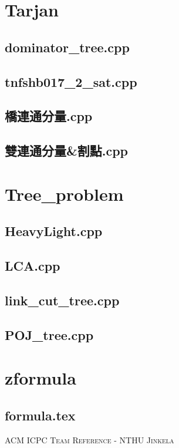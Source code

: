 \documentclass[a4paper,10pt,oneside]{article}
\newcommand{\includecpp}[2]{
  \subsection{#1}
    
}
\newcommand{\includetex}[2]{
  \subsection{#1}
    
}
\begin{document}
\begin{landscape}
\begin{multicols}{4}
\section{Tarjan}
  \includecpp{dominator\_tree.cpp}{./Tarjan/dominator_tree.cpp}
  \includecpp{tnfshb017\_2\_sat.cpp}{./Tarjan/tnfshb017_2_sat.cpp}
  \includecpp{橋連通分量.cpp}{./Tarjan/橋連通分量.cpp}
  \includecpp{雙連通分量\&割點.cpp}{./Tarjan/雙連通分量&割點.cpp}
\section{Tree\_problem}
  \includecpp{HeavyLight.cpp}{./Tree_problem/HeavyLight.cpp}
  \includecpp{LCA.cpp}{./Tree_problem/LCA.cpp}
  \includecpp{link\_cut\_tree.cpp}{./Tree_problem/link_cut_tree.cpp}
  \includecpp{POJ\_tree.cpp}{./Tree_problem/POJ_tree.cpp}
\section{zformula}
  \includetex{formula.tex}{./zformula/formula.tex}




  \end{multicols}
  \newpage
  \begin{multicols}{3}
  \enlargethispage*{\baselineskip}
  \begin{center}
    \Huge\textsc{ACM ICPC Team Reference - NTHU Jinkela}
    \vspace{0.35cm}    
  \end{center}
  \tableofcontents
  \end{multicols}
  \end{landscape}
\end{document}
